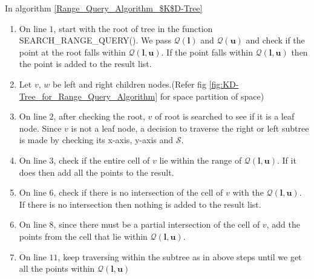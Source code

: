 In algorithm \ref{Range_Query_Algorithm_$K$D-Tree} 

\begin{enumerate}
    \item On line $1$, start with the root of tree in the function SEARCH\_RANGE\_QUERY(). We pass $\mathcal{Q}(\boldsymbol{l})$ and $\mathcal{Q}(\boldsymbol{u})$ and check if the point at the root falls within $\mathcal{Q}(\boldsymbol{l}, \boldsymbol{u})$. If the point falls within $\mathcal{Q}(\boldsymbol{l}, \boldsymbol{u})$ then the point is added to the result list.
    
    \item Let $v$, $w$ be left and right children nodes.(Refer fig \ref{fig:KD-Tree_for_Range_Query_Algorithm} for space partition of space)
    
    \item On line $2$, after checking the root, $v$ of root is searched to see if it is a leaf node. Since $v$ is not a leaf node, a decision to traverse the right or left subtree is made by checking its x-axis, y-axis and $\mathcal{S}$. 
    
    \item On line $3$, check if the entire cell of $v$ lie within the range of $\mathcal{Q}(\boldsymbol{l}, \boldsymbol{u})$. If it does then add all the points to the result.
    
    \item On line $6$, check if there is no intersection of the cell of $v$ with the $\mathcal{Q}(\boldsymbol{l}, \boldsymbol{u})$. If there is no intersection then nothing is added to the result list.
    
    \item On line $8$, since there must be a partial intersection of the cell of $v$, add the points from the cell that lie within $\mathcal{Q}(\boldsymbol{l}, \boldsymbol{u})$. 
    
    \item On line $11$, keep traversing within the subtree as in above steps until we get all the points within $\mathcal{Q}(\boldsymbol{l}, \boldsymbol{u})$
\end{enumerate}

